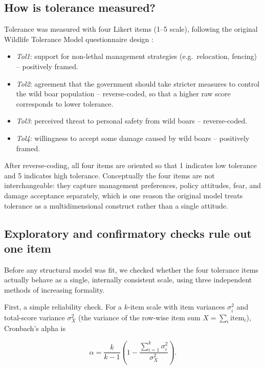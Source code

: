 \subsection{How is tolerance measured?}
\label{measurement:tolerance}

Tolerance was measured with four Likert items (1--5 scale), following the
original Wildlife Tolerance Model questionnaire design \citep{Kansky2016}:

\begin{itemize}
  \item \emph{Tol1}: support for non-lethal management strategies (e.g.\
    relocation, fencing) -- positively framed.
  \item \emph{Tol2}: agreement that the government should take stricter
    measures to control the wild boar population -- reverse-coded, so that a
    higher raw score corresponds to lower tolerance.
  \item \emph{Tol3}: perceived threat to personal safety from wild boars --
    reverse-coded.
  \item \emph{Tol4}: willingness to accept some damage caused by wild boars --
    positively framed.
\end{itemize}

After reverse-coding, all four items are oriented so that 1 indicates low
tolerance and 5 indicates high tolerance. Conceptually the four items are not
interchangeable: they capture management preferences, policy attitudes, fear,
and damage acceptance separately, which is one reason the original model
treats tolerance as a multidimensional construct rather than a single
attitude.

\subsection{Exploratory and confirmatory checks rule out one item}
\label{measurement:efa-cfa}

Before any structural model was fit, we checked whether the four tolerance
items actually behave as a single, internally consistent scale, using three
independent methods of increasing formality.

First, a simple reliability check. For a $k$-item scale with item variances
$\sigma_i^2$ and total-score variance $\sigma_X^2$ (the variance of the
row-wise item sum $X = \sum_i \text{item}_i$), Cronbach's alpha is

\begin{equation}
\alpha = \frac{k}{k-1}\left(1 - \frac{\sum_{i=1}^{k}\sigma_i^2}{\sigma_X^2}\right).
\label{eq:alpha}
\end{equation}

